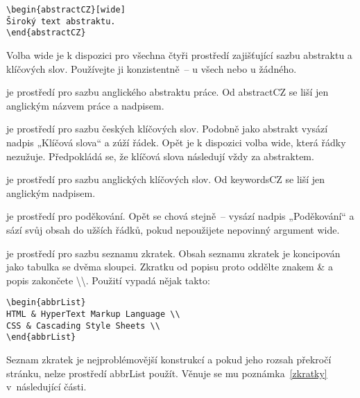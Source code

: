 \documentclass[FM,DP,EN]{tulthesis}
\newcommand{\argument}[1]{{\ttfamily\color{\tulcolor}#1}}
\newcommand{\argumentindex}[1]{\argument{#1}\index{#1}}
\newcommand{\prostredi}[1]{\argumentindex{#1}}
\newenvironment{myquote}{\begin{list}{}{\setlength\leftmargin\parindent}\item[]}{\end{list}}
\newenvironment{listing}{\begin{myquote}\color{\tulcolor}}{\end{myquote}}
\begin{document}
\begin{description}
\begin{listing}
\begin{verbatim}
\begin{abstractCZ}[wide]
Široký text abstraktu.
\end{abstractCZ}
\end{verbatim}
\end{listing}

Volba \argument{wide} je k dispozici pro všechna čtyři prostředí zajišťující
sazbu abstraktu a klíčových slov. Používejte ji konzistentně~-- u všech nebo u
žádného.

\item[\prostredi{abstractEN}] je prostředí pro sazbu anglického abstraktu práce.
Od \argument{abstractCZ} se liší jen anglickým názvem práce a nadpisem.

\item[\prostredi{keywordsCZ}] je prostředí pro sazbu českých klíčových slov.
Podobně jako abstrakt vysází nadpis „Klíčová slova“ a zúží řádek. Opět je k
dispozici volba \argument{wide}, která řádky nezužuje. Předpokládá se, že
klíčová slova následují vždy za abstraktem.

\item[\prostredi{keywordsEN}] je prostředí pro sazbu anglických klíčových slov.
Od \argument{keywordsCZ} se liší jen anglickým nadpisem.

\item[\prostredi{acknowledgement}] je prostředí pro poděkování. Opět se chová
stejně~-- vysází nadpis „Poděkování“ a sází svůj obsah do užších řádků, pokud
nepoužijete nepovinný argument \argument{wide}.

\item[\prostredi{abbrList}] je prostředí pro sazbu seznamu zkratek. Obsah
seznamu zkratek je koncipován jako tabulka se dvěma sloupci. Zkratku od popisu
proto oddělte znakem \argument{\&} a popis zakončete
\argument{\textbackslash\textbackslash}. Použití vypadá nějak takto:

{\color{\tulcolor}
\begin{verbatim}
\begin{abbrList}
HTML & HyperText Markup Language \\
CSS & Cascading Style Sheets \\
\end{abbrList}
\end{verbatim}}

Seznam zkratek je nejproblémovější konstrukcí a pokud jeho rozsah překročí
stránku, nelze prostředí \argument{abbrList} použít. Věnuje se mu
poznámka~\ref{zkratky} v~následující části.

\end{description}
\end{document}
